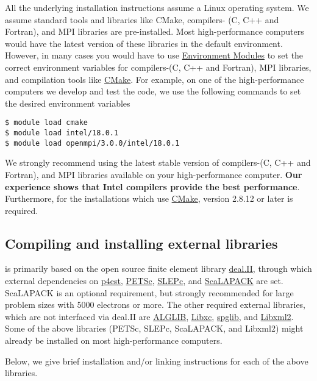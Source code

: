 All the underlying installation instructions assume a Linux operating system. We assume standard tools and libraries like CMake, compilers- (C, C++ and Fortran), and MPI libraries are pre-installed. Most high-performance computers would have the latest version of these libraries in the default environment. However, in many cases you would have to use \href{http://modules.sourceforge.net/}{Environment Modules} to set the correct environment variables for compilers-(C, C++ and Fortran), MPI libraries, and compilation tools like \href{http://www.cmake.org/}{CMake}. For example, on one of the high-performance computers we develop and test the \dftfe{} code, we use the following commands to set the desired environment variables
\begin{verbatim}
$ module load cmake
$ module load intel/18.0.1
$ module load openmpi/3.0.0/intel/18.0.1
\end{verbatim}
We strongly recommend using the latest stable version of compilers-(C, C++ and Fortran), and MPI libraries available on your high-performance computer. {\bf Our experience shows that Intel compilers provide the best performance}. Furthermore, for the installations which use \href{http://www.cmake.org/}{CMake}, version 2.8.12 or later is required.   

\subsection{Compiling and installing external libraries}
\dftfe{} is primarily based on the open source finite element library \href{http://www.dealii.org/}{deal.II}, through which external dependencies
on \href{http://p4est.org/}{p4est}, \href{https://www.mcs.anl.gov/petsc/}{PETSc}, \href{http://slepc.upv.es/}{SLEPc}, and \href{http://www.netlib.org/scalapack/}{ScaLAPACK} are set. ScaLAPACK is an optional requirement, but strongly recommended for large problem sizes with 5000 electrons or more. The other required external libraries, which are
not interfaced via deal.II are \href{http://www.alglib.net/}{ALGLIB}, \href{http://www.tddft.org/programs/libxc/}{Libxc}, \href{https://atztogo.github.io/spglib/}{spglib}, and \href{http://www.xmlsoft.org/}{Libxml2}. Some of the above libraries (PETSc, SLEPc, ScaLAPACK, and Libxml2) might already be installed on most high-performance computers.

Below, we give brief installation and/or linking instructions for each of the above libraries.
